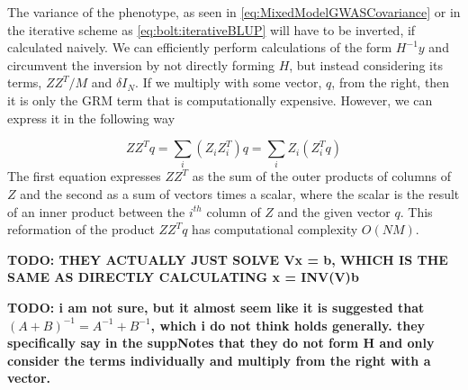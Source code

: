 The variance of the phenotype, as seen in \cref{eq:MixedModelGWASCovariance} or in the iterative scheme as \cref{eq:bolt:iterativeBLUP} will have to be inverted, if calculated naively. We can efficiently perform calculations of the form $ H^{-1}y $ and circumvent the inversion by not directly forming $ H $, but instead considering its terms, $ ZZ^T / M$ and $ \delta I_N$. If we multiply with some vector, $ q $, from the right, then it is only the GRM term that is computationally expensive. However, we can express it in the following way

\begin{equation}
ZZ^T q = \sum_i \left( Z_i Z_i^T\right) q = \sum_i  Z_i \left(Z_i^T q\right) 
\end{equation}
The first equation expresses $ Z Z^T $ as the sum of the outer products of columns of $ Z $ and the second as a sum of vectors times a scalar, where the scalar is the result of an inner product between the $ i^{th} $ column of $ Z $ and the given vector $ q $. This reformation of the product $ Z Z^T q$ has computational complexity $ O(NM) $.

\textbf{TODO: THEY ACTUALLY JUST SOLVE Vx = b, WHICH IS THE SAME AS DIRECTLY CALCULATING x = INV(V)b}

\textbf{TODO: i am not sure, but it almost seem like it is suggested that $ (A + B)^{-1} = A^{-1} + B^{-1} $, which i do not think holds generally. they specifically say in the suppNotes that they do not form H and only consider the terms individually and multiply from the right with a vector.}


%

